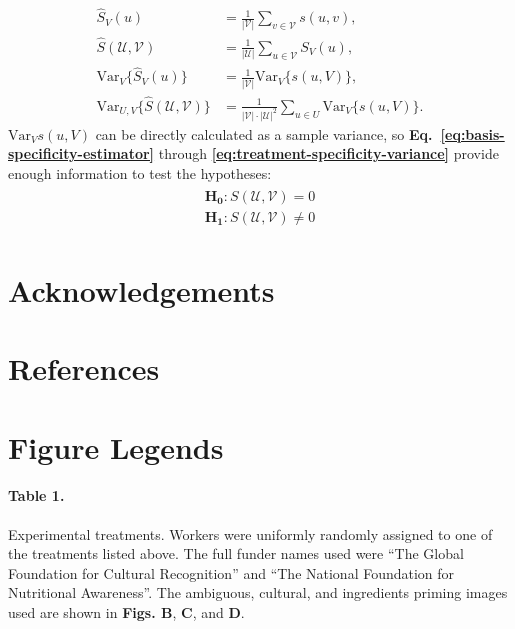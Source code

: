 \documentclass[a4paper]{report}
\begin{document}
\begin{align}
	\hat{S}_V(u) &= \frac{1}{|\mathcal{V}|} \sum_{v \in \mathcal{V}} s(u,v), 
		\label{eq:basis-specificity-estimator} \\
		\hat{S}(\mathcal{U},\mathcal{V}) 
			&= \frac{1}{|\mathcal{U}|} \sum_{u \in \mathcal{V}} S_V(u),
		\label{eq:treatment-specificity-estimator} \\
		\text{Var}_V\{\hat{S}_V(u)\} 
			&= \frac{1}{|\mathcal{V}|}\text{Var}_V\{s(u,V)\},
		\label{eq:basis-specificity-variance} \\
		\text{Var}_{U,V}\{\hat{S}(\mathcal{U},\mathcal{V})\} 
			&= \frac{1}{|\mathcal{V}|\cdot|\mathcal{U}|^2} 
			\sum_{u\in U}\text{Var}_V\{{s}(u,V)\}.
		\label{eq:treatment-specificity-variance}
\end{align}
$\text{Var}_V{s(u,V)}$ can be directly calculated as a sample variance, so
\textbf{Eq.~\ref{eq:basis-specificity-estimator}} through \textbf{\ref{eq:treatment-specificity-variance}} provide enough information to test the hypotheses:
\begin{align}
	\begin{matrix}
		\mathbf{H_0}: S(\mathcal{U}, \mathcal{V}) = 0 \\[0.5em]
		\mathbf{H_1}: S(\mathcal{U}, \mathcal{V}) \neq 0
	\end{matrix}
\end{align}

\section*{Acknowledgements}
\section*{References}
\begingroup
\renewcommand{\chapter}[2]{}

\endgroup
 

\section*{Figure Legends}

\paragraph{Table 1.}
	Experimental treatments.  Workers were uniformly randomly
	assigned to one of the treatments listed above.  The full funder 
	names used were ``The Global Foundation
	for Cultural Recognition'' and ``The National Foundation for 
	Nutritional Awareness''.  The ambiguous, cultural, and ingredients 
	priming images used are shown in \textbf{Figs. B}, \textbf{C}, and 
	\textbf{D}.
\end{document}
